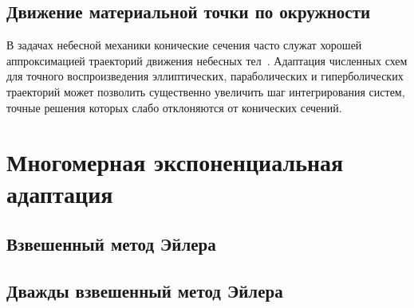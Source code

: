 % 


\subsection{Движение материальной точки по окружности}
\label{subsection:methods:circular_orbit}

В задачах небесной механики конические сечения часто служат
хорошей аппроксимацией траекторий движения небесных тел~\cite{landau2022mechanics}.
Адаптация численных схем для точного воспроизведения эллиптических, параболических и гиперболических траекторий
может позволить существенно увеличить шаг интегрирования систем,
точные решения которых слабо отклоняются от конических сечений.


\section{Многомерная экспоненциальная адаптация}
\label{section:methods:exponential_fitting}

\subsection{Взвешенный метод Эйлера}
\label{subsection:methods:weighted_Euler}

\subsection{Дважды взвешенный метод Эйлера}
\label{subsection:methods:double_weighted_Euler}
